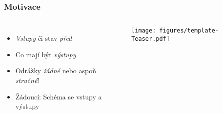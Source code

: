 




\begin{frame}
    \frametitle{Motivace}
    \begin{columns}
      \begin{itemize}
          \item \emph{Vstupy} či stav \emph{před}
          \item Co mají být \emph{výstupy}
          \item Odrážky \emph{žádné} nebo aspoň \emph{stručné}!
          \item Žádoucí: Schéma se vstupy a výstupy
      \end{itemize}
       
      \texttt{[image: figures/template-Teaser.pdf]}
    \end{columns}
  \end{frame}
  
  
  
